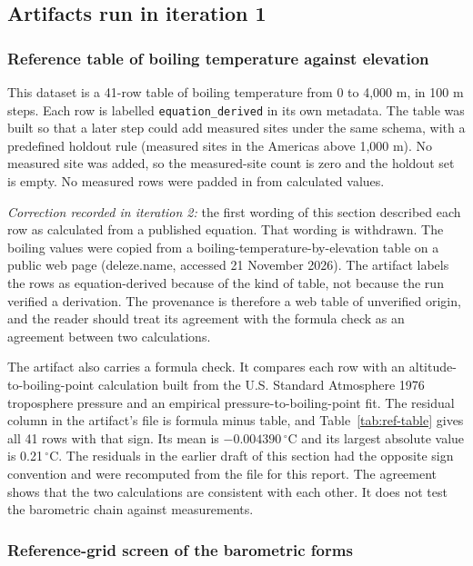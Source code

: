 \documentclass[11pt,letterpaper]{article}
\begin{document}
\subsection{Artifacts run in iteration 1}

\subsubsection{Reference table of boiling temperature against elevation}

This dataset is a 41-row table of boiling temperature from 0 to 4,000 m, in 100 m steps. Each row is labelled \texttt{equation\_derived} in its own metadata. The table was built so that a later step could add measured sites under the same schema, with a predefined holdout rule (measured sites in the Americas above 1,000 m). No measured site was added, so the measured-site count is zero and the holdout set is empty. No measured rows were padded in from calculated values.

\emph{Correction recorded in iteration 2:} the first wording of this section described each row as calculated from a published equation. That wording is withdrawn. The boiling values were copied from a boiling-temperature-by-elevation table on a public web page (deleze.name, accessed 21 November 2026). The artifact labels the rows as equation-derived because of the kind of table, not because the run verified a derivation. The provenance is therefore a web table of unverified origin, and the reader should treat its agreement with the formula check as an agreement between two calculations.

The artifact also carries a formula check. It compares each row with an altitude-to-boiling-point calculation built from the U.S. Standard Atmosphere 1976 troposphere pressure and an empirical pressure-to-boiling-point fit. The residual column in the artifact's file is formula minus table, and Table~\ref{tab:ref-table} gives all 41 rows with that sign. Its mean is $-0.004390$\,$^\circ$C and its largest absolute value is 0.21\,$^\circ$C. The residuals in the earlier draft of this section had the opposite sign convention and were recomputed from the file for this report. The agreement shows that the two calculations are consistent with each other. It does not test the barometric chain against measurements.



\subsubsection{Reference-grid screen of the barometric forms}
\end{document}
